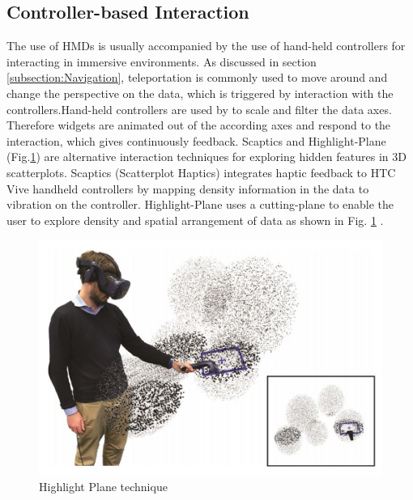 \subsection{Controller-based Interaction}
\label{subsection:Controller-based Interaction}
The use of \ac{HMD}s is usually accompanied by the use of hand-held controllers for interacting in immersive environments. As discussed in section \ref{subsection:Navigation}, teleportation is commonly used to move around and change the perspective on the data, which is triggered by interaction with the controllers.\newline Hand-held controllers are used by \cite{Cordeil2017a} to scale and filter the data axes. Therefore widgets are animated out of the according axes and respond to the interaction, which gives continuously feedback.\newline
Scaptics and Highlight-Plane (Fig.\ref{figure:HighlightPlane}) are alternative interaction techniques for exploring hidden features in 3D scatterplots. Scaptics (Scatterplot Haptics) integrates haptic feedback to HTC Vive handheld controllers by mapping density information in the data to vibration on the controller. Highlight-Plane uses a cutting-plane to enable the user to explore density and spatial arrangement of data as shown in Fig. \ref{figure:HighlightPlane} \autocite[]{Prouzeau2019}.
 \begin{figure}[!h]
    \centering
	\includegraphics[width=0.5 \textwidth]{images/Prouzeau2019_HighlightPlane.JPG}
	\caption{
		Highlight Plane technique  \autocite{Prouzeau2019}
	}
	\label{figure:HighlightPlane} 
\end{figure}

